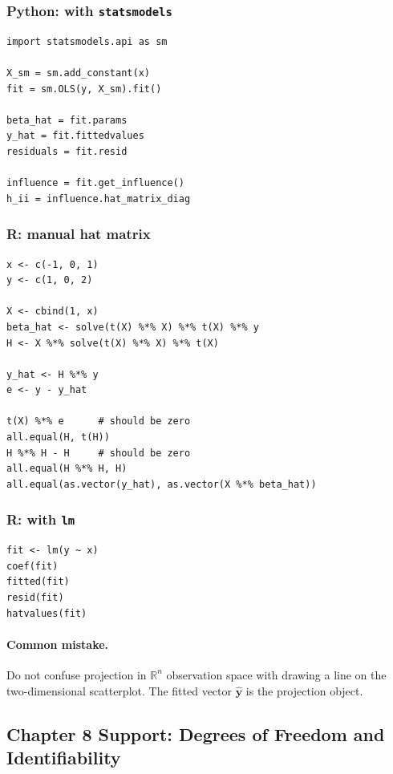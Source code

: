 \subsubsection*{Python: with \texttt{statsmodels}}

\begin{verbatim}
import statsmodels.api as sm

X_sm = sm.add_constant(x)
fit = sm.OLS(y, X_sm).fit()

beta_hat = fit.params
y_hat = fit.fittedvalues
residuals = fit.resid

influence = fit.get_influence()
h_ii = influence.hat_matrix_diag
\end{verbatim}

\subsubsection*{R: manual hat matrix}

\begin{verbatim}
x <- c(-1, 0, 1)
y <- c(1, 0, 2)

X <- cbind(1, x)
beta_hat <- solve(t(X) %*% X) %*% t(X) %*% y
H <- X %*% solve(t(X) %*% X) %*% t(X)

y_hat <- H %*% y
e <- y - y_hat

t(X) %*% e      # should be zero
all.equal(H, t(H))
H %*% H - H     # should be zero
all.equal(H %*% H, H)
all.equal(as.vector(y_hat), as.vector(X %*% beta_hat))
\end{verbatim}

\subsubsection*{R: with \texttt{lm}}

\begin{verbatim}
fit <- lm(y ~ x)
coef(fit)
fitted(fit)
resid(fit)
hatvalues(fit)
\end{verbatim}

\paragraph{Common mistake.} Do not confuse projection in \(\mathbb{R}^n\) observation space with drawing a line on the two-dimensional scatterplot.  The fitted vector \(\widehat{\mathbf{y}}\) is the projection object.

\subsection{Chapter 8 Support: Degrees of Freedom and Identifiability}
\label{app:ch08-software-cookbook-degrees-of-freedom-and-identifiability}

